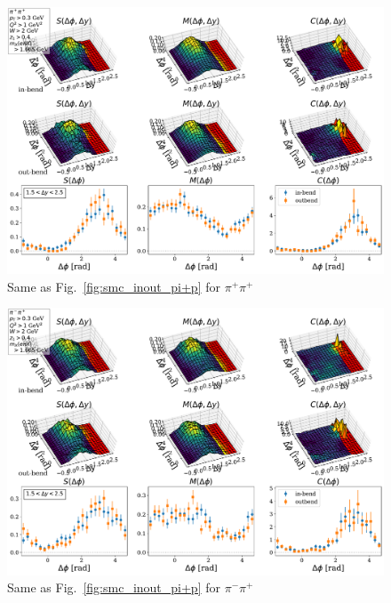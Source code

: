 \begin{figure}
    \centering
    \includegraphics[width=\textwidth]{images/smc_inout_pi+pi+.pdf}
    \caption{Same as Fig.~\ref{fig:smc_inout_pi+p} for $\pi^+\pi^+$}
    \label{fig:smc_inout_pi+pi+}
\end{figure}

\begin{figure}
    \centering
    \includegraphics[width=\textwidth]{images/smc_inout_pi-pi+.pdf}
    \caption{Same as Fig.~\ref{fig:smc_inout_pi+p} for $\pi^-\pi^+$}
    \label{fig:smc_inout_pi-pi+}
\end{figure}

